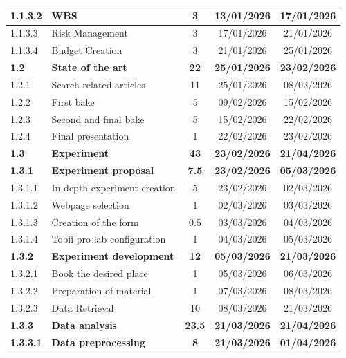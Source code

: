 \begin{landscape}
\begin{longtable}{|l|l|c|c|c|}
        \hline
        1.1.3.2 & WBS & 3 & 13/01/2026 & 17/01/2026 \\
        \hline
        1.1.3.3 & Risk Management & 3 & 17/01/2026 & 21/01/2026 \\
        \hline
        1.1.3.4 & Budget Creation & 3 & 21/01/2026 & 25/01/2026 \\
        \hline
        \textbf{1.2} & \textbf{State of the art} & \textbf{22} & \textbf{25/01/2026} & \textbf{23/02/2026} \\
        \hline
        1.2.1 & Search related articles & 11 & 25/01/2026 & 08/02/2026 \\
        \hline
        1.2.2 & First bake & 5 & 09/02/2026 & 15/02/2026 \\
        \hline
        1.2.3 & Second and final bake & 5 & 15/02/2026 & 22/02/2026 \\
        \hline
        1.2.4 & Final presentation & 1 & 22/02/2026 & 23/02/2026 \\
        \hline
        \textbf{1.3} & \textbf{Experiment} & \textbf{43} & \textbf{23/02/2026} & \textbf{21/04/2026} \\
        \hline
        \textbf{1.3.1} & \textbf{Experiment proposal} & \textbf{7.5} & \textbf{23/02/2026} & \textbf{05/03/2026} \\
        \hline
        1.3.1.1 & In depth experiment creation & 5 & 23/02/2026 & 02/03/2026 \\
        \hline
        1.3.1.2 & Webpage selection & 1 & 02/03/2026 & 03/03/2026 \\
        \hline
        1.3.1.3 & Creation of the form & 0.5 & 03/03/2026 & 04/03/2026 \\
        \hline
        1.3.1.4 & Tobii pro lab configuration & 1 & 04/03/2026 & 05/03/2026 \\
        \hline
        \textbf{1.3.2} & \textbf{Experiment development} & \textbf{12} & \textbf{05/03/2026} & \textbf{21/03/2026} \\
        \hline
        1.3.2.1 & Book the desired place & 1 & 05/03/2026 & 06/03/2026 \\
        \hline
        1.3.2.2 & Preparation of material & 1 & 07/03/2026 & 08/03/2026 \\
        \hline
        1.3.2.3 & Data Retrieval & 10 & 08/03/2026 & 21/03/2026 \\
        \hline
        \textbf{1.3.3} & \textbf{Data analysis} & \textbf{23.5} & \textbf{21/03/2026} & \textbf{21/04/2026} \\
        \hline
        \textbf{1.3.3.1} & \textbf{Data preprocessing} & \textbf{8} & \textbf{21/03/2026} & \textbf{01/04/2026} \\

\end{longtable}
\end{landscape}
